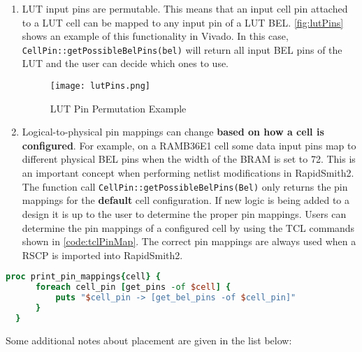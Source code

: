\begin {enumerate}
  \item LUT input pins are permutable. This means that an input cell pin
  attached to a LUT cell can be mapped to any input pin of a LUT BEL.
  \autoref{fig:lutPins} shows an example of this functionality in Vivado. In
  this case,  \texttt{CellPin::get\-PossibleBelPins(bel)} will return
  all input BEL pins of the LUT and the user can decide which ones to
  use.
  
  \begin{figure}[t!]
	\centering
	\texttt{[image: lutPins.png]}
	\caption{LUT Pin Permutation Example}
	\label{fig:lutPins}
  \end{figure}
  
  \item Logical-to-physical pin mappings can change \textbf{based on how a cell
  is configured}. For example, on a RAMB36E1 cell some data input pins map to
  different physical BEL pins when the width of the BRAM is set to 72. This is
  an important concept when performing netlist modifications in RapidSmith2. The
  function call \texttt{CellPin::get\-PossibleBelPins(Bel)} only returns the pin
  mappings for the \textbf{default} cell configuration. If new logic is being
  added to a design it is up to the user to determine the proper pin mappings. 
  Users can determine the pin mappings of a configured cell by using the TCL
  commands shown in \autoref{code:tclPinMap}. The correct pin mappings are
  always used when a RSCP is imported into RapidSmith2.

\end{enumerate}

\newpage
\begin{lstlisting}[xleftmargin=1.5em, framexleftmargin=1.5em, language=tcl,
caption=TCL script to print all logical-to-physical pin mappings of a
cell,label=code:tclPinMap] 
  proc print_pin_mappings{cell} {
	  foreach cell_pin [get_pins -of $cell] {
		  puts "$cell_pin -> [get_bel_pins -of $cell_pin]" 
	  }
  }
\end{lstlisting}
 
\vspace{.2cm}
\noindent
Some additional notes about placement are given in the list below: 

